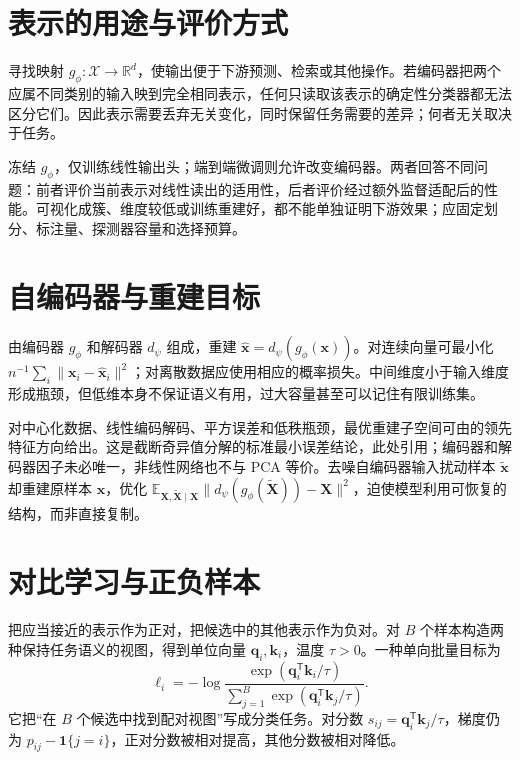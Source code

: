 \documentclass[UTF8,12pt,a4paper,fontset=fandol]{ctexbook}
\begin{document}
\section{表示的用途与评价方式}
寻找映射 $g_\phi:\mathcal X\to\mathbb R^d$，使输出便于下游预测、检索或其他操作。若编码器把两个应属不同类别的输入映到完全相同表示，任何只读取该表示的确定性分类器都无法区分它们。因此表示需要丢弃无关变化，同时保留任务需要的差异；何者无关取决于任务。

冻结 $g_\phi$，仅训练线性输出头；端到端微调则允许改变编码器。两者回答不同问题：前者评价当前表示对线性读出的适用性，后者评价经过额外监督适配后的性能。可视化成簇、维度较低或训练重建好，都不能单独证明下游效果；应固定划分、标注量、探测器容量和选择预算。

\section{自编码器与重建目标}
由编码器 $g_\phi$ 和解码器 $d_\psi$ 组成，重建 $\widehat{\mathbf x}=d_\psi(g_\phi(\mathbf x))$。对连续向量可最小化 $n^{-1}\sum_i\|\mathbf x_i-\widehat{\mathbf x}_i\|^2$；对离散数据应使用相应的概率损失。中间维度小于输入维度形成瓶颈，但低维本身不保证语义有用，过大容量甚至可以记住有限训练集。

对中心化数据、线性编码解码、平方误差和低秩瓶颈，最优重建子空间可由的领先特征方向给出。这是截断奇异值分解的标准最小误差结论，此处引用；编码器和解码器因子未必唯一，非线性网络也不与 PCA 等价。去噪自编码器输入扰动样本 $\widetilde{\mathbf x}$ 却重建原样本 $\mathbf x$，优化 $\mathbb E_{\mathbf X,\widetilde{\mathbf X}\mid\mathbf X}\|d_\psi(g_\phi(\widetilde{\mathbf X}))-\mathbf X\|^2$，迫使模型利用可恢复的结构，而非直接复制。

\section{对比学习与正负样本}
把应当接近的表示作为正对，把候选中的其他表示作为负对。对 $B$ 个样本构造两种保持任务语义的视图，得到单位向量 $\mathbf q_i,\mathbf k_i$，温度 $\tau>0$。一种单向批量目标为
\begin{equation}
\ell_i=-\log\frac{\exp(\mathbf q_i^\mathsf T\mathbf k_i/\tau)}{\sum_{j=1}^B\exp(\mathbf q_i^\mathsf T\mathbf k_j/\tau)}.
\label{eq:dl-contrastive}
\end{equation}
它把“在 $B$ 个候选中找到配对视图”写成分类任务。对分数 $s_{ij}=\mathbf q_i^\mathsf T\mathbf k_j/\tau$，梯度仍为 $p_{ij}-\mathbf1\{j=i\}$，正对分数被相对提高，其他分数被相对降低。
\end{document}
